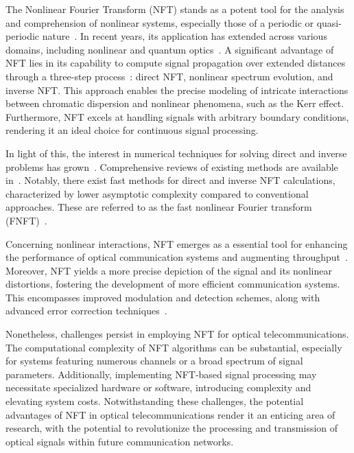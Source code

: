 The Nonlinear Fourier Transform (NFT) stands as a potent tool for the analysis and comprehension of nonlinear systems, especially those of a periodic or quasi-periodic nature~\cite{ZakharovShabat1972, Ablowitz1981, Kamalian2018}. In recent years, its application has extended across various domains, including nonlinear and quantum optics~\cite{Gelash2019PRL, Mullyadzhanov2019, Chekhovskoy2019_PRL}.
A significant advantage of NFT lies in its capability to compute signal propagation over extended distances through a three-step process~\cite{Yousefi2014I}: direct NFT, nonlinear spectrum evolution, and inverse NFT. This approach enables the precise modeling of intricate interactions between chromatic dispersion and nonlinear phenomena, such as the Kerr effect. Furthermore, NFT excels at handling signals with arbitrary boundary conditions, rendering it an ideal choice for continuous signal processing.

In light of this, the interest in numerical techniques for solving direct and inverse problems has grown~\cite{Boffetta1992a, Belai2006, Frumin2015_TIB, 10026447}. Comprehensive reviews of existing methods are available in~\cite{Yousefi2014II, Turitsyn2017Optica, Vasylchenkova2019a}. Notably, there exist fast methods for direct and inverse NFT calculations, characterized by lower asymptotic complexity compared to conventional approaches. These are referred to as the fast nonlinear Fourier transform (FNFT)~\cite{Wahls2013, Wahls2015, Wahls2015a, Wahls2016, Vaibhav2018, Wahls2018, Chimmalgi2019}.

Concerning nonlinear interactions, NFT emerges as a essential tool for enhancing the performance of optical communication systems and augmenting throughput~\cite{Kamalian2018, Turitsyn2017Optica, Le2014, Prilepsky2014, essiambre2012capacity, Civelli2019, Sedov:18}. Moreover, NFT yields a more precise depiction of the signal and its nonlinear distortions, fostering the development of more efficient communication systems. This encompasses improved modulation and detection schemes, along with advanced error correction techniques~\cite{Frumin2017, Gui2017a, Aref2018_JLT}.

Nonetheless, challenges persist in employing NFT for optical telecommunications. The computational complexity of NFT algorithms can be substantial, especially for systems featuring numerous channels or a broad spectrum of signal parameters. Additionally, implementing NFT-based signal processing may necessitate specialized hardware or software, introducing complexity and elevating system costs.
Notwithstanding these challenges, the potential advantages of NFT in optical telecommunications render it an enticing area of research, with the potential to revolutionize the processing and transmission of optical signals within future communication networks.

